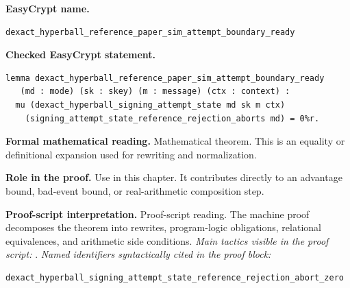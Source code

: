 \begin{formaltheorem}
\noindent\textbf{EasyCrypt name.}
\begin{lstlisting}[language=EasyCrypt,basicstyle=\ttfamily\scriptsize]
dexact_hyperball_reference_paper_sim_attempt_boundary_ready
\end{lstlisting}
\noindent\textbf{Checked EasyCrypt statement.}
\begin{lstlisting}[language=EasyCrypt,basicstyle=\ttfamily\scriptsize]
lemma dexact_hyperball_reference_paper_sim_attempt_boundary_ready
   (md : mode) (sk : skey) (m : message) (ctx : context) :
  mu (dexact_hyperball_signing_attempt_state md sk m ctx)
    (signing_attempt_state_reference_rejection_aborts md) = 0%r.
\end{lstlisting}
\noindent\textbf{Formal mathematical reading.}
Mathematical theorem. This is an equality or definitional expansion used for rewriting and normalization.

\noindent\textbf{Role in the proof.}
Use in this chapter. It contributes directly to an advantage bound, bad-event bound, or real-arithmetic composition step.

\noindent\textbf{Proof-script interpretation.}
Proof-script reading. The machine proof decomposes the theorem into rewrites, program-logic obligations, relational equivalences, and arithmetic side conditions.
\emph{Main tactics visible in the proof script:} .
\emph{Named identifiers syntactically cited in the proof block:}
\begin{lstlisting}[language=EasyCrypt,basicstyle=\ttfamily\scriptsize]
dexact_hyperball_signing_attempt_state_reference_rejection_abort_zero
\end{lstlisting}

\end{formaltheorem}

